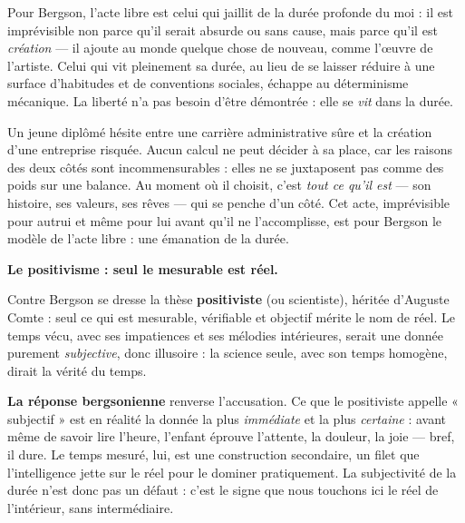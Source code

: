 \documentclass[11pt]{article}
\newcounter{popsec}
\newcounter{popsub}
\newcommand{\courssub}[1]{%
  \stepcounter{popsub}%
  \par\vspace{9pt}\noindent{\popxbold\fontsize{11.5}{13}\selectfont\color{popink}{\color{poporange}\thepopsec.\thepopsub}\hspace{6pt}#1}\par\nopagebreak\vspace{4pt}
}
\begin{document}
\begin{propriete}
Pour Bergson, l'acte libre est celui qui jaillit de la durée profonde du moi : il est imprévisible non parce qu'il serait absurde ou sans cause, mais parce qu'il est \emph{création} — il ajoute au monde quelque chose de nouveau, comme l'œuvre de l'artiste. Celui qui vit pleinement sa durée, au lieu de se laisser réduire à une surface d'habitudes et de conventions sociales, échappe au déterminisme mécanique. La liberté n'a pas besoin d'être démontrée : elle se \emph{vit} dans la durée.
\end{propriete}

\begin{exemplebox}
Un jeune diplômé hésite entre une carrière administrative sûre et la création d'une entreprise risquée. Aucun calcul ne peut décider à sa place, car les raisons des deux côtés sont incommensurables : elles ne se juxtaposent pas comme des poids sur une balance. Au moment où il choisit, c'est \emph{tout ce qu'il est} — son histoire, ses valeurs, ses rêves — qui se penche d'un côté. Cet acte, imprévisible pour autrui et même pour lui avant qu'il ne l'accomplisse, est pour Bergson le modèle de l'acte libre : une émanation de la durée.
\end{exemplebox}

\courssub{La thèse adverse et la réponse de Bergson}

\textbf{Le positivisme : seul le mesurable est réel.}\par

Contre Bergson se dresse la thèse \textbf{positiviste} (ou scientiste), héritée d'Auguste Comte : seul ce qui est mesurable, vérifiable et objectif mérite le nom de réel. Le temps vécu, avec ses impatiences et ses mélodies intérieures, serait une donnée purement \emph{subjective}, donc illusoire : la science seule, avec son temps homogène, dirait la vérité du temps.

\textbf{La réponse bergsonienne} renverse l'accusation. Ce que le positiviste appelle « subjectif » est en réalité la donnée la plus \emph{immédiate} et la plus \emph{certaine} : avant même de savoir lire l'heure, l'enfant éprouve l'attente, la douleur, la joie — bref, il dure. Le temps mesuré, lui, est une construction secondaire, un filet que l'intelligence jette sur le réel pour le dominer pratiquement. La subjectivité de la durée n'est donc pas un défaut : c'est le signe que nous touchons ici le réel de l'intérieur, sans intermédiaire.
\end{document}
